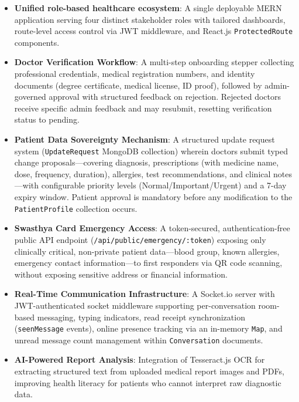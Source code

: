 \documentclass[conference]{IEEEtran}
\begin{document}
\begin{itemize}
    \item \textbf{Unified role-based healthcare ecosystem}: A single deployable MERN application serving four distinct stakeholder roles with tailored dashboards, route-level access control via JWT middleware, and React.js \texttt{ProtectedRoute} components.

    \item \textbf{Doctor Verification Workflow}: A multi-step onboarding stepper collecting professional credentials, medical registration numbers, and identity documents (degree certificate, medical license, ID proof), followed by admin-governed approval with structured feedback on rejection. Rejected doctors receive specific admin feedback and may resubmit, resetting verification status to pending.

    \item \textbf{Patient Data Sovereignty Mechanism}: A structured update request system (\texttt{UpdateRequest} MongoDB collection) wherein doctors submit typed change proposals—covering diagnosis, prescriptions (with medicine name, dose, frequency, duration), allergies, test recommendations, and clinical notes—with configurable priority levels (Normal/Important/Urgent) and a 7-day expiry window. Patient approval is mandatory before any modification to the \texttt{PatientProfile} collection occurs.

    \item \textbf{Swasthya Card Emergency Access}: A token-secured, authentication-free public API endpoint (\texttt{/api/public/emergency/:token}) exposing only clinically critical, non-private patient data—blood group, known allergies, emergency contact information—to first responders via QR code scanning, without exposing sensitive address or financial information.

    \item \textbf{Real-Time Communication Infrastructure}: A Socket.io server with JWT-authenticated socket middleware supporting per-conversation room-based messaging, typing indicators, read receipt synchronization (\texttt{seenMessage} events), online presence tracking via an in-memory \texttt{Map}, and unread message count management within \texttt{Conversation} documents.

    \item \textbf{AI-Powered Report Analysis}: Integration of Tesseract.js OCR for extracting structured text from uploaded medical report images and PDFs, improving health literacy for patients who cannot interpret raw diagnostic data.
\end{itemize}
\end{document}
